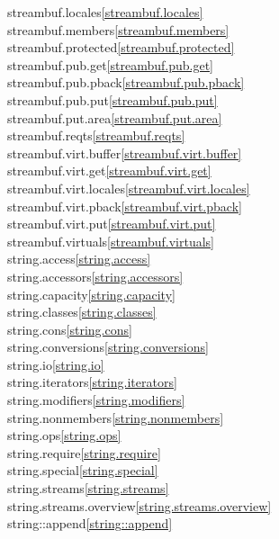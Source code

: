 \begin{multicols}{2}
streambuf.locales\quad\ref{streambuf.locales}\\
streambuf.members\quad\ref{streambuf.members}\\
streambuf.protected\quad\ref{streambuf.protected}\\
streambuf.pub.get\quad\ref{streambuf.pub.get}\\
streambuf.pub.pback\quad\ref{streambuf.pub.pback}\\
streambuf.pub.put\quad\ref{streambuf.pub.put}\\
streambuf.put.area\quad\ref{streambuf.put.area}\\
streambuf.reqts\quad\ref{streambuf.reqts}\\
streambuf.virt.buffer\quad\ref{streambuf.virt.buffer}\\
streambuf.virt.get\quad\ref{streambuf.virt.get}\\
streambuf.virt.locales\quad\ref{streambuf.virt.locales}\\
streambuf.virt.pback\quad\ref{streambuf.virt.pback}\\
streambuf.virt.put\quad\ref{streambuf.virt.put}\\
streambuf.virtuals\quad\ref{streambuf.virtuals}\\
string.access\quad\ref{string.access}\\
string.accessors\quad\ref{string.accessors}\\
string.capacity\quad\ref{string.capacity}\\
string.classes\quad\ref{string.classes}\\
string.cons\quad\ref{string.cons}\\
string.conversions\quad\ref{string.conversions}\\
string.io\quad\ref{string.io}\\
string.iterators\quad\ref{string.iterators}\\
string.modifiers\quad\ref{string.modifiers}\\
string.nonmembers\quad\ref{string.nonmembers}\\
string.ops\quad\ref{string.ops}\\
string.require\quad\ref{string.require}\\
string.special\quad\ref{string.special}\\
string.streams\quad\ref{string.streams}\\
string.streams.overview\quad\ref{string.streams.overview}\\
string::append\quad\ref{string::append}\\

\end{multicols}
